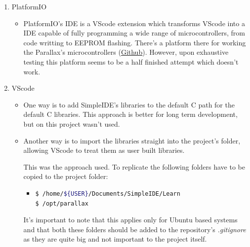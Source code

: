 \documentclass{report}
\begin{document}
      \begin{enumerate}
            \item PlatformIO
                  \begin{itemize}
                        \item PlatformIO's IDE is a VScode
                        extension which transforms VScode into a IDE capable of
                        fully programming a wide range of microcontrollers, from
                        code writting to EEPROM flashing. There's a platform
                        there for working the Parallax's
                        microcontrollers (\href{https://github.com/msquirogac/platform-propeller}{Github}).
                        However, upon exhaustive testing this platform seems to
                        be a half finished attempt which doesn't work.
                  \end{itemize}
            \item VScode
                  \begin{itemize}
                        \item One way is to add SimpleIDE's libraries to the
                        default C path for the default C libraries. This
                        approach is better for long term development, but on
                        this project wasn't used.

                        \item Another way is to import the libraries straight
                        into the project's folder, allowing VScode to treat them
                        as user built libraries.
                        
                        This was the approach used. To replicate the following
                        folders have to be copied to the project folder:
                        \begin{itemize}
                              \item \begin{lstlisting}[language=bash]
$ /home/${USER}/Documents/SimpleIDE/Learn
$ /opt/parallax
                                    \end{lstlisting}
                              \end{itemize}
                              It's important to note that this applies only for Ubuntu
                                    based systems and that both these folders should be
                                    added to the repository's \textit{.gitignore} as they
                                    are quite big and not important to the project itself.
                  \end{itemize}
      \end{enumerate}
\end{document}
